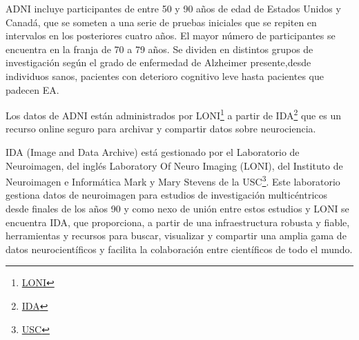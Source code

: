 ADNI incluye participantes de entre 50 y 90 años de edad de Estados Unidos y Canadá, que se someten a una serie de
pruebas iniciales que se repiten en intervalos en los posteriores cuatro años.
El mayor número de participantes se encuentra en la franja de 70 a 79 años.
Se dividen en distintos grupos de investigación según el grado de enfermedad de Alzheimer presente,desde individuos
sanos, pacientes con deterioro cognitivo leve hasta pacientes que padecen EA.

Los datos de ADNI están administrados por LONI\footnote{\href{https://loni.usc.edu/}{LONI}} a partir de
IDA\footnote{\href{https://ida.loni.usc.edu/}{IDA}} que es un recurso online seguro para archivar y compartir datos
sobre neurociencia.

IDA (Image and Data Archive) está gestionado por el Laboratorio de Neuroimagen, del inglés Laboratory Of Neuro Imaging
(LONI), del Instituto de Neuroimagen e Informática Mark y Mary Stevens de la
USC\footnote{\href{https://www.ini.usc.edu/}{USC}}.
Este laboratorio gestiona datos de neuroimagen para estudios de investigación multicéntricos desde finales de los
años 90 y como nexo de unión entre estos estudios y LONI se encuentra IDA, que proporciona, a partir de una
infraestructura robusta y fiable, herramientas y recursos para buscar, visualizar y compartir una amplia gama de datos
neurocientíficos y facilita la colaboración entre científicos de todo el mundo.

